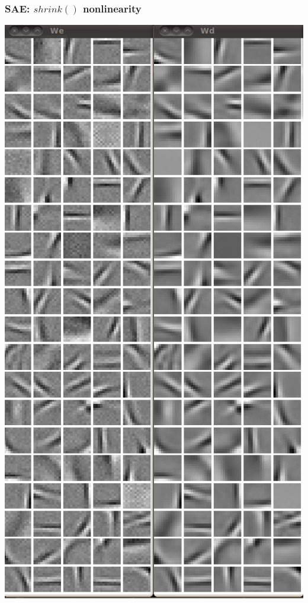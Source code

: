 \documentclass{beamer}
\begin{document}
\begin{frame}
\frametitle{SAE: $shrink()$ nonlinearity} 
\begin{center} 
\includegraphics[scale = 0.20]{Wshrink.png}

\end{center}
\end{frame}
\end{document}
